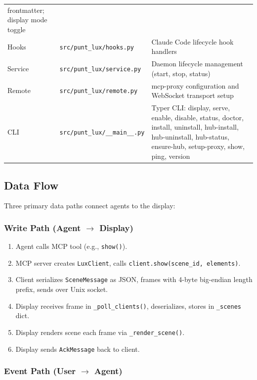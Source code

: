 \documentclass[a4paper,10pt]{article}
\newcommand{\modpath}[1]{\texttt{src/punt\_lux/#1}}
\newcommand{\tool}[1]{\texttt{#1}}
\newcommand{\msg}[1]{\texttt{#1}}
\begin{document}
\begin{center}
\begin{tabular}{llp{7cm}}
              frontmatter; display mode toggle \\
Hooks       & \modpath{hooks.py}     & Claude Code lifecycle hook handlers \\
Service     & \modpath{service.py}   & Daemon lifecycle management
              (start, stop, status) \\
Remote      & \modpath{remote.py}    & mcp-proxy configuration and
              WebSocket transport setup \\
CLI         & \modpath{\_\_main\_\_.py} & Typer CLI: display, serve, enable,
              disable, status, doctor, install, uninstall, hub-install,
              hub-uninstall, hub-status, ensure-hub, setup-proxy, show,
              ping, version \\
\bottomrule
\end{tabular}
\end{center}

\subsection{Data Flow}

Three primary data paths connect agents to the display:

\subsubsection{Write Path (Agent $\to$ Display)}

\begin{enumerate}
  \item Agent calls MCP tool (e.g., \tool{show()}).
  \item MCP server creates \texttt{LuxClient}, calls
    \texttt{client.show(scene\_id, elements)}.
  \item Client serializes \msg{SceneMessage} as JSON, frames with
    4-byte big-endian length prefix, sends over Unix socket.
  \item Display receives frame in \texttt{\_poll\_clients()},
    deserializes, stores in \texttt{\_scenes} dict.
  \item Display renders scene each frame via
    \texttt{\_render\_scene()}.
  \item Display sends \msg{AckMessage} back to client.
\end{enumerate}

\subsubsection{Event Path (User $\to$ Agent)}
\end{document}
